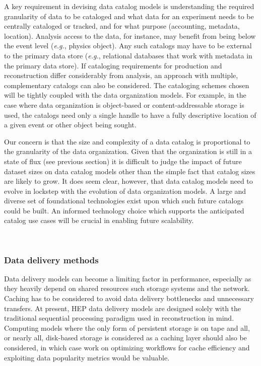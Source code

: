 \documentclass[12pt,a4paper]{article}
\begin{document}
A key requirement in devising data catalog models is understanding the
required granularity of data to be cataloged and what data for an
experiment needs to be centrally cataloged or tracked, and for what
purpose (accounting, metadata, location). Analysis access to the data,
for instance, may benefit from being below the event level (\emph{e.g.}, physics
object). Any such catalogs may have to be external to the primary data
store (\emph{e.g.}, relational databases that work with metadata in the primary
data store). If cataloging requirements for production and
reconstruction differ considerably from analysis, an approach with
multiple, complementary catalogs can also be considered. The cataloging
schemes chosen will be tightly coupled with the data organization
models. For example, in the case where data organization is object-based
or content-addressable storage is used, the catalogs need only a single
%
%
handle to have a fully descriptive location of a given event or other
object being sought.
%
%

Our concern is that the size and complexity of a data catalog is
proportional to the granularity of the data organization. Given that the
organization is still in a state of flux (see previous section) it is
difficult to judge the impact of future dataset sizes on data catalog
models other than the simple fact that catalog sizes are likely to grow.
It does seem clear, however, that data catalog models need to evolve in
lockstep with the evolution of data organization models. A large and
diverse set of foundational technologies exist upon which such future
catalogs could be built. An informed technology choice which supports
the anticipated catalog use cases will be crucial in enabling future
scalability.

~

\subsubsection{Data delivery methods}\label{data-delivery-methods}

Data delivery models can become a limiting factor in performance,
especially as they heavily depend on shared resources such storage
systems and the network. Caching has to be considered to avoid data
delivery bottlenecks and unnecessary transfers. At present, HEP data
delivery models are designed solely with the traditional sequential
processing paradigm used in reconstruction in mind. Computing models
where the only form of persistent storage is on tape and all, or nearly
all, disk-based storage is considered as a caching layer should also be
considered, in which case work on optimizing workflows for cache
efficiency and exploiting data popularity metrics would be valuable.
\end{document}
